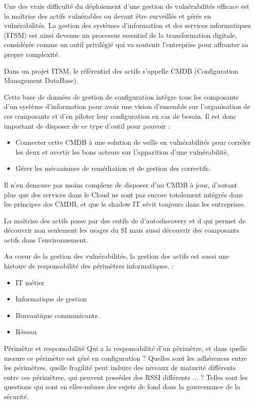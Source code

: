 Une des vraie difficulté du déploiement d'une gestion de vulnérabilités efficace est la maîtrise des actifs vulnérables ou devant être surveillés et gérés en vulnérabilités.
La gestion des systèmes d'information et des services informatiques (ITSM) est ainsi devenue un processus essentiel de la transformation digitale, considérée comme un outil privilégié qui va soutenir l’entreprise pour affronter sa propre complexité.

Dans un projet ITSM, le référentiel des actifs s’appelle CMDB (Configuration Management DataBase).

Cette base de données de gestion de configuration intègre  tous les composants d’un système d'information pour  avoir une vision d’ensemble sur l’organisation de ces composants et d’en piloter leur configuration en cas de besoin.
Il est donc important de disposer de ce type d'outil pour pouvoir :

\begin{itemize}
  \item Connecter cette CMDB à une solution de veille en vulnérabilités pour corréler les deux et avertir les bons acteurs sur l'apparition d'une vulnérabilité,
\item Gérer les mécanismes de remédiation et de gestion des correctifs.
\end{itemize}

Il n'en demeure pas moins complexe de disposer d'un CMDB à jour, d'autant plus que des services dans le Cloud ne sont pas encore totalement intégrés dans les principes des CMDB, et que le shadow IT  sévit toujours dans les entreprises.

La maîtrise des actifs passe par des outils de d'autodiscovery et d qui permet de découvrir non seulement les usages du SI mais aussi découvrir des composants actifs dans l'environnement.

Au coeur de la gestion des vulnérabilités, la gestion des actifs est aussi une histoire de responsabilité des périmètres  informatiques. :

\begin{itemize}
  \item IT métier
  \item Informatique de gestion
  \item Bureautique communicante.
  \item Réseau
\end{itemize}



\begin{techworkbox}{Périmètre et responsabilité}
Qui a la responsabilité d'un périmètre, et dans quelle mesure ce périmètre est géré en configuration ? Quelles sont les adhérences entre les périmètres, quelle fragilité peut induire des niveaux de maturité différents entre ces périmètres, qui peuvent posséder des RSSI différents ... ? Telles sont les questions qui sont en elles-mêmes des sujets de fond dans la gouvernance de la sécurité.
\end{techworkbox}


